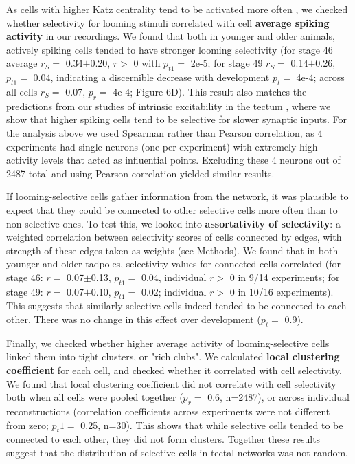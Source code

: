\documentclass{article}
\begin{document}
As cells with higher Katz centrality tend to be activated more often \citep{fletcher2018katz}, we checked whether selectivity for looming stimuli correlated with cell \textbf{average spiking activity} in our recordings. We found that both in younger and older animals, actively spiking cells tended to have stronger looming selectivity (for stage 46 average $r_S=$ 0.34$\pm$0.20, $r>$ 0 with $p_{t1}=$ 2e-5; for stage 49 $r_S=$ 0.14$\pm$0.26, $p_{t1}=$ 0.04, indicating a discernible decrease with development $p_t=$ 4e-4; across all cells $r_S=$ 0.07, $p_r=$ 4e-4; Figure 6D). This result also matches the predictions from our studies of intrinsic excitability in the tectum \citep{busch2019}, where we show that higher spiking cells tend to be selective for slower synaptic inputs. For the analysis above we used Spearman rather than Pearson correlation, as 4 experiments had single neurons (one per experiment) with extremely high activity levels that acted as influential points. Excluding these 4 neurons out of 2487 total and using Pearson correlation yielded similar results.

If looming-selective cells gather information from the network, it was plausible to expect that they could be connected to other selective cells more often than to non-selective ones. To test this, we looked into \textbf{assortativity of selectivity}: a weighted correlation between selectivity scores of cells connected by edges, with strength of these edges taken as weights (see Methods). We found that in both younger and older tadpoles, selectivity values for connected cells correlated (for stage 46: $r=$ 0.07$\pm$0.13, $p_{t1}=$ 0.04, individual $r>$ 0 in 9/14 experiments; for stage 49: $r=$ 0.07$\pm$0.10, $p_{t1}=$ 0.02; individual $r>$ 0 in 10/16 experiments). This suggests that similarly selective cells indeed tended to be connected to each other. There was no change in this effect over development ($p_t=$ 0.9).


Finally, we checked whether higher average activity of looming-selective cells linked them into tight clusters, or "rich clubs". We calculated \textbf{local clustering coefficient} for each cell, and checked whether it correlated with cell selectivity. We found that local clustering coefficient did not correlate with cell selectivity both when all cells were pooled together ($p_r=$ 0.6, n=2487), or across individual reconstructions (correlation coefficients across experiments were not different from zero; $p_t1=$ 0.25, n=30). This shows that while selective cells tended to be connected to each other, they did not form clusters. Together these results suggest that the distribution of selective cells in tectal networks was not random.
\end{document}
